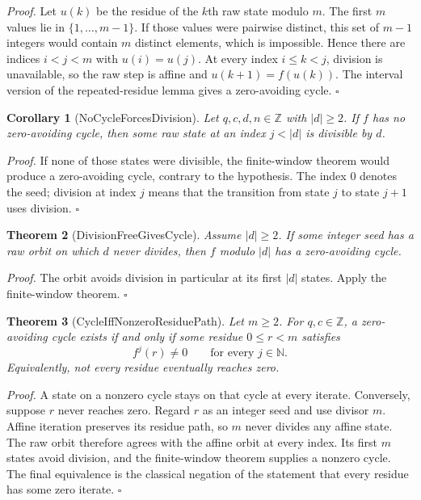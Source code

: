 \documentclass[11pt,letterpaper]{article}
\newcommand{\N}{\mathbb{N}}
\newcommand{\Z}{\mathbb{Z}}
\newtheorem{theorem}{Theorem}
\newtheorem{corollary}[theorem]{Corollary}
\newenvironment{proof}{\noindent\textit{Proof.}}{\hfill\(\square\)}
\begin{document}
\begin{proof}
Let \(u(k)\) be the residue of the \(k\)th raw state modulo \(m\). The first \(m\) values lie in \(\{1,\ldots,m-1\}\). If those values were pairwise distinct, this set of \(m-1\) integers would contain \(m\) distinct elements, which is impossible. Hence there are indices \(i<j<m\) with \(u(i)=u(j)\). At every index \(i\le k<j\), division is unavailable, so the raw step is affine and \(u(k+1)=f(u(k))\). The interval version of the repeated-residue lemma gives a zero-avoiding cycle.
\end{proof}

\begin{corollary}[NoCycleForcesDivision]
Let \(q,c,d,n\in\Z\) with \(|d|\ge 2\). If \(f\) has no zero-avoiding cycle, then some raw state at an index \(j<|d|\) is divisible by \(d\).
\end{corollary}

\begin{proof}
If none of those states were divisible, the finite-window theorem would produce a zero-avoiding cycle, contrary to the hypothesis. The index \(0\) denotes the seed; division at index \(j\) means that the transition from state \(j\) to state \(j+1\) uses division.
\end{proof}

\begin{theorem}[DivisionFreeGivesCycle]
Assume \(|d|\ge 2\). If some integer seed has a raw orbit on which \(d\) never divides, then \(f\) modulo \(|d|\) has a zero-avoiding cycle.
\end{theorem}

\begin{proof}
The orbit avoids division in particular at its first \(|d|\) states. Apply the finite-window theorem.
\end{proof}

\begin{theorem}[CycleIffNonzeroResiduePath]
Let \(m\ge2\). For \(q,c\in\Z\), a zero-avoiding cycle exists if and only if some residue \(0\le r<m\) satisfies
\[
  f^j(r)\ne0\qquad\text{for every }j\in\N.
\]
Equivalently, not every residue eventually reaches zero.
\end{theorem}

\begin{proof}
A state on a nonzero cycle stays on that cycle at every iterate. Conversely, suppose \(r\) never reaches zero. Regard \(r\) as an integer seed and use divisor \(m\). Affine iteration preserves its residue path, so \(m\) never divides any affine state. The raw orbit therefore agrees with the affine orbit at every index. Its first \(m\) states avoid division, and the finite-window theorem supplies a nonzero cycle. The final equivalence is the classical negation of the statement that every residue has some zero iterate.
\end{proof}
\end{document}
